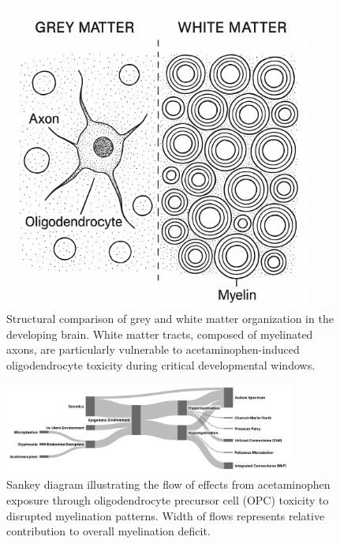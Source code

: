 \documentclass[12pt]{article}
\begin{document}
\begin{figure}[h]
\centering
\includegraphics[width=0.9\textwidth]{../assets/GreyWhiteMatter.png}
\caption{Structural comparison of grey and white matter organization in the developing brain. White matter tracts, composed of myelinated axons, are particularly vulnerable to acetaminophen-induced oligodendrocyte toxicity during critical developmental windows.}
\label{fig:grey-white-matter}
\end{figure}


\begin{figure}[h]
\centering
\includegraphics[width=0.85\textwidth]{../assets/Myelination-Sankey.png}
\caption{Sankey diagram illustrating the flow of effects from acetaminophen exposure through oligodendrocyte precursor cell (OPC) toxicity to disrupted myelination patterns. Width of flows represents relative contribution to overall myelination deficit.}
\label{fig:myelination-sankey}
\end{figure}
\end{document}
